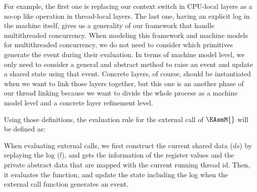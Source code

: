 For example, the first one is replacing our context switch 
in CPU-local layers as a no-op like operation in thread-local layers.
The last one, having an explicit log in the machine itself, gives us 
a generality of our framework that handle multithreaded concurrency. 
When modeling this framework and machine models for multithreaded concurrency, 
we do not need to consider which primitives 
generate the event during their evaluation.
In terms of machine model level, 
we only need to consider a general and abstract method to raise an event and update 
a shared state using that event.
Concrete layers, of course, should be instantiated when we want to link those layers together, but 
this one is an another phase of our thread linking because we want to divide the whole process as 
a machine model level and a concrete layer refinement level. 

Using those definitions, the evaluation rule for the external call of $\EAsmM{}$ will be defined as:
\begin{tiny}
\begin{mathpar}
\end{mathpar}
\end{tiny}
When evaluating external calls, 
we first construct the current shared data ($ds$) by replaying the log ($l$), 
and gets the information of the register values and the private abstract data that are mapped with the current 
running thread id.
Then, it evaluates the function, and update the state 
including the log when the external call function generates an event.

